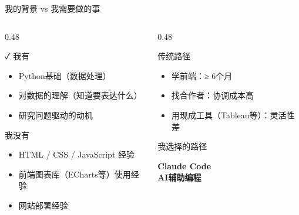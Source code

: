 \documentclass[aspectratio=169,11pt]{beamer}
\begin{document}
\begin{frame}{我的背景 vs 我需要做的事}
  \begin{columns}[T]
    \begin{column}{0.48\linewidth}
      \begin{exampleblock}{\faCheck\; 我有}
        \begin{itemize}
          \item Python基础（数据处理）
          \item 对数据的理解（知道要表达什么）
          \item 研究问题驱动的动机
        \end{itemize}
      \end{exampleblock}
      \vspace{0.5em}
      \begin{alertblock}{\faTimes\; 我没有}
        \begin{itemize}
          \item HTML / CSS / JavaScript 经验
          \item 前端图表库（ECharts等）使用经验
          \item 网站部署经验
        \end{itemize}
      \end{alertblock}
    \end{column}
    \begin{column}{0.48\linewidth}
      \begin{block}{传统路径}
        \begin{itemize}
          \item 学前端：≥ 6个月
          \item 找合作者：协调成本高
          \item 用现成工具（Tableau等）：灵活性差
        \end{itemize}
      \end{block}
      \vspace{0.5em}
      \begin{block}{我选择的路径}
        \begin{center}
          \Large\color{prismclay}\bfseries Claude Code\\
          \normalsize AI辅助编程
        \end{center}
      \end{block}
    \end{column}
  \end{columns}
\end{frame}
\end{document}

